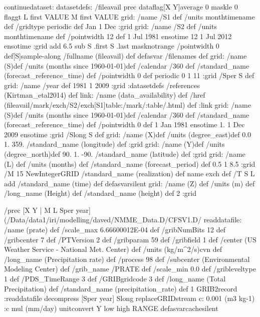 \begin{ingrid}
continuedataset:
datasetdefs:
/fileavail {
prec dataflag[X Y]average 0 maskle 0 flaggt L first VALUE M first VALUE grid: /name /S1 def /units monthtimename def /gridtype periodic def Jan 1 Dec :grid grid: /name /S2 def /units monthtimename def /pointwidth 12 def 1 Jul 1981 ensotime 12 1 Jul 2012 ensotime :grid add 6.5 sub S .first S .last masknotrange  /pointwidth 0 def[S]sample-along /fullname (fileavail) def
} defasvar
/filenames {
} def
grid:
/name (S)def
/units (months since 1960-01-01)def
/calendar /360 def
/standard_name (forecast_reference_time) def
/pointwidth 0 def
periodic
0 1 11
:grid
/Sper S def
grid:
/name /year def
1981 1 2009
:grid
:datasetdefs
/references (Kirtman_etal2014) def
link:
/name (data_availability) def
/href (fileavail/mark/exch/S2/exch[S1]table:/mark/:table/.html) def 
:link
grid:
/name (S)def
/units (months since 1960-01-01)def
/calendar /360 def
/standard_name (forecast_reference_time) def
/pointwidth 0 def
1 Jan 1981 ensotime
 1. 
1 Dec 2009 ensotime
:grid
/Slong S def
grid:
/name (X)def
/units (degree_east)def
 0.0 1. 359.
/standard_name (longitude) def
:grid
grid:
/name (Y)def
/units (degree_north)def
 90. 1. -90.
/standard_name (latitude) def
:grid
grid:
/name (L) def
/units (months) def
/standard_name (forecast_period) def
0.5 1 8.5
:grid
/M 15 NewIntegerGRID
/standard_name (realization) def
 name exch def
/T { S L add
/standard_name (time) def } defasvarsilent
grid:
/name (Z) def
/units (m) def
/long_name (Height) def
/standard_name (height) def
2 :grid
\end{ingrid}
\begin{ingrid}
 /prec{
[X
    Y  |
    M L Sper year] (/Data/data1/iri/modelling/daved/NMME_Data.D/CFSV1.D/%
readdatafile:
/name (prate) def
  /scale_max 6.66600012E-04 def
 /gribNumBits 12 def
 /gribcenter 7 def
 /PTVersion 2 def
 /gribparam 59 def
 /gribfield 1 def
 /center (US Weather Service - National Met. Center) def
 /units (kg/m^2/s)cvn def
 /long_name (Precipitation rate) def
 /process 98 def
 /subcenter (Environmental Modeling Center) def
 /grib_name /PRATE def
 /scale_min 0.0 def
 /gribleveltype 1 def
 /PDS_TimeRange 3 def
 /GRIBgridcode 3 def
/long_name (Total Precipitation) def
/standard_name (precipitation_rate) def
1 GRIB2record :readdatafile
decompress
[Sper year] Slong replaceGRIDstream
c: 0.001 (m3 kg-1) :c
mul (mm/day) unitconvert
Y low high RANGE
}defasvarcachesilent
\end{ingrid}
